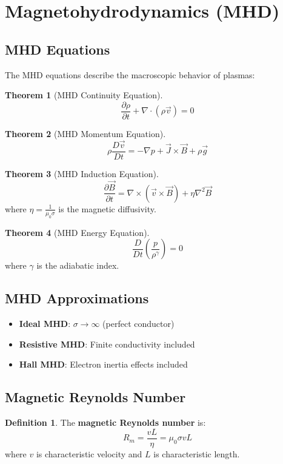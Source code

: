 \documentclass[11pt]{article}
\theoremstyle{definition}
\newtheorem{definition}{Definition}[section]
\newtheorem{theorem}{Theorem}[section]
\begin{document}
\section{Magnetohydrodynamics (MHD)}

\subsection{MHD Equations}
The MHD equations describe the macroscopic behavior of plasmas:

\begin{theorem}[MHD Continuity Equation]
$$\frac{\partial \rho}{\partial t} + \nabla \cdot (\rho \vec{v}) = 0$$
\end{theorem}

\begin{theorem}[MHD Momentum Equation]
$$\rho \frac{D\vec{v}}{Dt} = -\nabla p + \vec{J} \times \vec{B} + \rho \vec{g}$$
\end{theorem}

\begin{theorem}[MHD Induction Equation]
$$\frac{\partial \vec{B}}{\partial t} = \nabla \times (\vec{v} \times \vec{B}) + \eta \nabla^2 \vec{B}$$
where $\eta = \frac{1}{\mu_0 \sigma}$ is the magnetic diffusivity.
\end{theorem}

\begin{theorem}[MHD Energy Equation]
$$\frac{D}{Dt}\left(\frac{p}{\rho^{\gamma}}\right) = 0$$
where $\gamma$ is the adiabatic index.
\end{theorem}

\subsection{MHD Approximations}
\begin{itemize}
    \item \textbf{Ideal MHD}: $\sigma \to \infty$ (perfect conductor)
    \item \textbf{Resistive MHD}: Finite conductivity included
    \item \textbf{Hall MHD}: Electron inertia effects included
\end{itemize}

\subsection{Magnetic Reynolds Number}
\begin{definition}
The \textbf{magnetic Reynolds number} is:
$$R_m = \frac{vL}{\eta} = \mu_0 \sigma vL$$
where $v$ is characteristic velocity and $L$ is characteristic length.
\end{definition}
\end{document}
